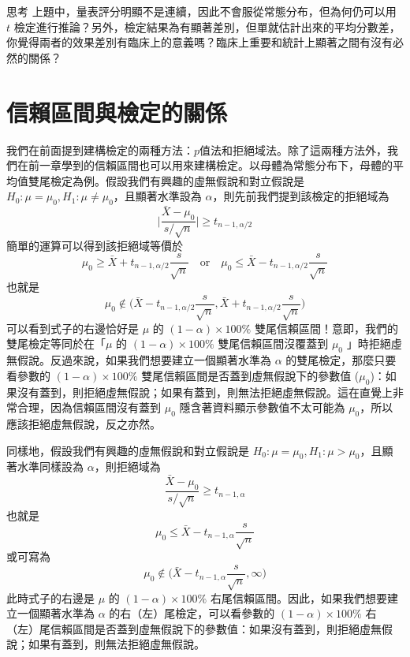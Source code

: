     \bigskip

    \begin{custom}{思考}
        上題中，量表評分明顯不是連續，因此不會服從常態分布，但為何仍可以用 $t$ 檢定進行推論？另外，檢定結果為有顯著差別，但單就估計出來的平均分數差，你覺得兩者的效果差別有臨床上的意義嗎？臨床上重要和統計上顯著之間有沒有必然的關係？
    \end{custom}

\section{信賴區間與檢定的關係}
    我們在前面提到建構檢定的兩種方法：$p$值法和拒絕域法。除了這兩種方法外，我們在前一章學到的信賴區間也可以用來建構檢定。以母體為常態分布下，母體的平均值雙尾檢定為例。假設我們有興趣的虛無假說和對立假說是 $H_0: \mu = \mu_0, H_1: \mu \ne \mu_0$，且顯著水準設為 $\alpha$，則先前我們提到該檢定的拒絕域為
    \[\Big|\frac{\bar{X}-\mu_0}{s/\sqrt{n}}\Big| \ge t_{n-1, \alpha/2}\]
    簡單的運算可以得到該拒絕域等價於
    \[\mu_0 \ge \bar{X} + t_{n-1, \alpha/2}\frac{s}{\sqrt{n}} \quad \text{or} \quad \mu_0 \le \bar{X} - t_{n-1, \alpha/2}\frac{s}{\sqrt{n}}\]
    也就是
    \[\mu_0 \notin \Big(\bar{X} - t_{n-1, \alpha/2}\frac{s}{\sqrt{n}}, \bar{X} + t_{n-1, \alpha/2}\frac{s}{\sqrt{n}}\Big)\]
    可以看到式子的右邊恰好是 $\mu$ 的 $(1-\alpha)\times 100\%$ 雙尾信賴區間！意即，我們的雙尾檢定等同於在「$\mu$ 的 $(1-\alpha)\times 100\%$ 雙尾信賴區間沒覆蓋到 $\mu_0$ 」時拒絕虛無假說。反過來說，如果我們想要建立一個顯著水準為 $\alpha$ 的雙尾檢定，那麼只要看參數的 $(1-\alpha) \times 100\%$ 雙尾信賴區間是否蓋到虛無假說下的參數值 ($\mu_0$)：如果沒有蓋到，則拒絕虛無假說；如果有蓋到，則無法拒絕虛無假說。這在直覺上非常合理，因為信賴區間沒有蓋到 $\mu_0$ 隱含著資料顯示參數值不太可能為 $\mu_0$，所以應該拒絕虛無假說，反之亦然。

    同樣地，假設我們有興趣的虛無假說和對立假說是 $H_0: \mu = \mu_0, H_1: \mu > \mu_0$，且顯著水準同樣設為 $\alpha$，則拒絕域為
    \[\frac{\bar{X}-\mu_0}{s/\sqrt{n}} \ge t_{n-1, \alpha}\]
    也就是
    \[\mu_0 \le \bar{X}-t_{n-1, \alpha}\frac{s}{\sqrt{n}}\]
    或可寫為
    \[\mu_0 \notin \Big(\bar{X} - t_{n-1, \alpha}\frac{s}{\sqrt{n}}, \infty\Big)\]
    此時式子的右邊是 $\mu$ 的 $(1-\alpha)\times 100\%$ 右尾信賴區間。因此，如果我們想要建立一個顯著水準為 $\alpha$ 的右（左）尾檢定，可以看參數的 $(1-\alpha) \times 100\%$ 右（左）尾信賴區間是否蓋到虛無假說下的參數值：如果沒有蓋到，則拒絕虛無假說；如果有蓋到，則無法拒絕虛無假說。

